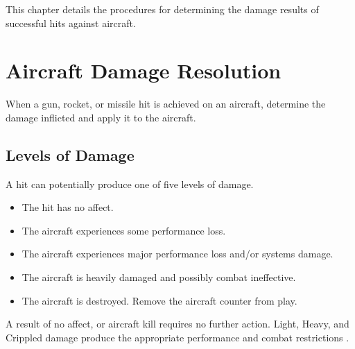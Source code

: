 
\label{rule:aircraft-damage}

This chapter details the procedures for determining the damage results of successful hits against aircraft.

\section{Aircraft Damage Resolution}
\label{rule:aircraft-damage-resolution}

When a gun, rocket, or missile hit is achieved on an aircraft, determine the damage inflicted and apply it to the aircraft.

\subsection{Levels of Damage} A hit can potentially produce one of five levels of damage.

\begin{itemize}

    \item{} The hit has no affect.

    \item{} The aircraft experiences some performance loss.

    \item{} The aircraft experiences major performance loss and/or systems damage.

    \item{} The aircraft is heavily damaged and possibly combat ineffective.

    \item{} The aircraft is destroyed. Remove the aircraft counter from play.

\end{itemize}

A result of no affect, or aircraft kill requires no further action. Light, Heavy, and Crippled damage produce the appropriate performance and combat restrictions .



